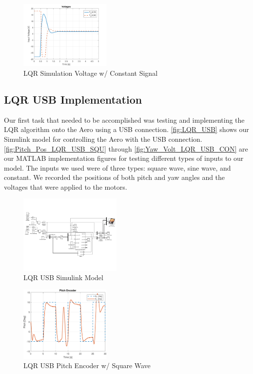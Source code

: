 \documentclass[letterpaper, 10pt, conference]{ieeeconf}
\begin{document}
\begin{figure}
  \centering
  \includegraphics[width=0.4\textwidth]{figs/matlab/LQR/LQR_Simulation/LQR_Volt_Con}
  \caption{LQR Simulation Voltage w/ Constant Signal}
  \label{fig:LQR_Volt_Con}
\end{figure}

\subsection{LQR USB Implementation} \label{sec:LQR_USB_imp}

Our first task that needed to be accomplished was testing and implementing the LQR algorithm onto the Aero using a USB connection.  \autoref{fig:LQR_USB} shows our Simulink model for controlling the Aero with the USB connection.  \autoref{fig:Pitch_Pos_LQR_USB_SQU} through \autoref{fig:Yaw_Volt_LQR_USB_CON} are our MATLAB implementation figures for testing different types of inputs to our model.  The inputs we used were of three types: square wave, sine wave, and constant.  We recorded the positions of both pitch and yaw angles and the voltages that were applied to the motors.

\begin{figure}
  \centering
  \includegraphics[width=0.45\textwidth]{figs/img/LQR_USB}
  \caption{LQR USB Simulink Model}
  \label{fig:LQR_USB}
\end{figure}

\begin{figure}
  \centering
  \includegraphics[width=0.4\textwidth]{figs/matlab/LQR/Pitch_Pos_LQR_USB_SQU}
  \caption{LQR USB Pitch Encoder w/ Square Wave}
  \label{fig:Pitch_Pos_LQR_USB_SQU}
\end{figure}
\end{document}

